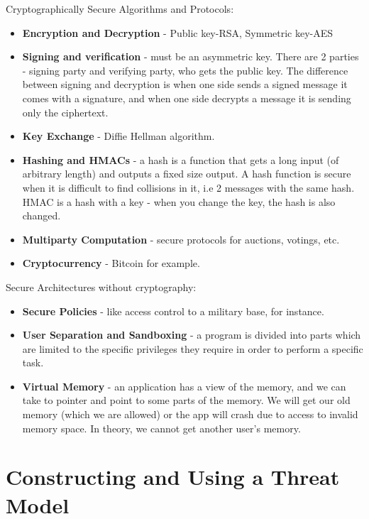 Cryptographically Secure Algorithms and Protocols:
\begin{itemize}
    \item \textbf{Encryption and Decryption} - Public key-RSA, Symmetric key-AES
    \item \textbf{Signing and verification} - must be an asymmetric key. There
    are 2 parties - signing party and verifying party, who gets the public key.
    The difference between signing and decryption is when one side sends a
    signed message it comes with a signature, and when one side decrypts a
    message it is sending only the ciphertext.
    \item \textbf{Key Exchange} - Diffie Hellman algorithm.
    \item \textbf{Hashing and HMACs} - a hash is a function that gets a long
    input (of arbitrary length) and outputs a fixed size output. A hash
    function is secure when it is difficult to find collisions in it, i.e 2 messages with
    the same hash. HMAC is a hash with a key - when you change the key, the hash
    is also changed.
    \item \textbf{Multiparty Computation} - secure protocols for auctions, votings, etc.
    \item \textbf{Cryptocurrency} - Bitcoin for example.
\end{itemize}

Secure Architectures without cryptography:
\begin{itemize}
    \item \textbf{Secure Policies} - like access control to a military base, for  instance.
    \item \textbf{User Separation and Sandboxing} - a program is divided into
    parts which are limited to the specific privileges they require in order to perform a
    specific task.
    \item \textbf{Virtual Memory} - an application has a view of the memory, and we
    can take to pointer and point to some parts of the memory. We will get our
    old memory (which we are allowed) or the app will crash due to access to
    invalid memory space. In theory, we cannot get another user's memory.
\end{itemize}

\section{Constructing and Using a Threat Model} \label{sec:BreakImpl}

